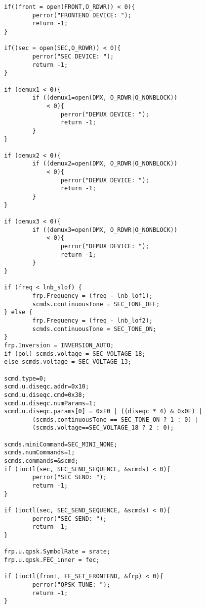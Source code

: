 {\begin{verbatim}
        if((front = open(FRONT,O_RDWR)) < 0){
                perror("FRONTEND DEVICE: ");
                return -1;
        }

        if((sec = open(SEC,O_RDWR)) < 0){
                perror("SEC DEVICE: ");
                return -1;
        }

        if (demux1 < 0){
                if ((demux1=open(DMX, O_RDWR|O_NONBLOCK)) 
                    < 0){
                        perror("DEMUX DEVICE: ");
                        return -1;
                }
        }

        if (demux2 < 0){
                if ((demux2=open(DMX, O_RDWR|O_NONBLOCK)) 
                    < 0){
                        perror("DEMUX DEVICE: ");
                        return -1;
                }
        }

        if (demux3 < 0){
                if ((demux3=open(DMX, O_RDWR|O_NONBLOCK)) 
                    < 0){
                        perror("DEMUX DEVICE: ");
                        return -1;
                }
        }

        if (freq < lnb_slof) {
                frp.Frequency = (freq - lnb_lof1);
                scmds.continuousTone = SEC_TONE_OFF;
        } else {
                frp.Frequency = (freq - lnb_lof2);
                scmds.continuousTone = SEC_TONE_ON;
        }
        frp.Inversion = INVERSION_AUTO;
        if (pol) scmds.voltage = SEC_VOLTAGE_18;
        else scmds.voltage = SEC_VOLTAGE_13;
        
        scmd.type=0;
        scmd.u.diseqc.addr=0x10;
        scmd.u.diseqc.cmd=0x38;
        scmd.u.diseqc.numParams=1;
        scmd.u.diseqc.params[0] = 0xF0 | ((diseqc * 4) & 0x0F) | 
                (scmds.continuousTone == SEC_TONE_ON ? 1 : 0) |
                (scmds.voltage==SEC_VOLTAGE_18 ? 2 : 0);

        scmds.miniCommand=SEC_MINI_NONE;
        scmds.numCommands=1;
        scmds.commands=&scmd;
        if (ioctl(sec, SEC_SEND_SEQUENCE, &scmds) < 0){
                perror("SEC SEND: ");
                return -1;
        }

        if (ioctl(sec, SEC_SEND_SEQUENCE, &scmds) < 0){
                perror("SEC SEND: ");
                return -1;
        }

        frp.u.qpsk.SymbolRate = srate;
        frp.u.qpsk.FEC_inner = fec;

        if (ioctl(front, FE_SET_FRONTEND, &frp) < 0){
                perror("QPSK TUNE: ");
                return -1;
        }
 

\end{verbatim}}
